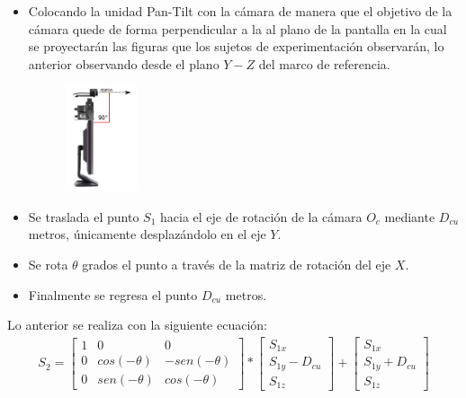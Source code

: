       \begin{itemize}
      	\item Colocando la unidad Pan-Tilt con la cámara de manera que el objetivo de la cámara quede de forma perpendicular a la al plano de la pantalla en la cual se proyectarán las figuras que los sujetos de experimentación observarán, lo anterior observando desde el plano $Y-Z$ del marco de referencia.
       \begin{figure}[htbp]
       	\centering
       	\includegraphics[width=0.2\textwidth]{./pictures/pantilt2}
       	\caption{}\label{fig: figura}
       	\label{pantilt2}
       \end{figure}
      	
      	\item Se traslada el punto $S_1$ hacia el eje de rotación de la cámara $O_c$ mediante $D_{cu}$ metros, únicamente desplazándolo en el eje $Y$.
      	\item Se rota $\theta$ grados el punto a través de la matriz de rotación del eje $X$.
      	\item Finalmente se regresa el punto $D_{cu}$ metros.
      \end{itemize}
	Lo anterior se realiza con la siguiente ecuación:
	        \begin{eqnarray}
	        S_2=
	        \begin{bmatrix}
	        1 & 0 & 0\\
	        0 & cos(-\theta) & -sen(-\theta)\\
	        0 & sen(-\theta) & cos(-\theta)
	        \end{bmatrix}*\begin{bmatrix}S_{1x}\\
	         S_{1y}-D_{cu}\\
	          S_{1z}
	        \end{bmatrix}+\begin{bmatrix}S_{1x}\\
	        S_{1y}+D_{cu}\\
	        S_{1z}
	        \end{bmatrix}
	        \end{eqnarray}
      
